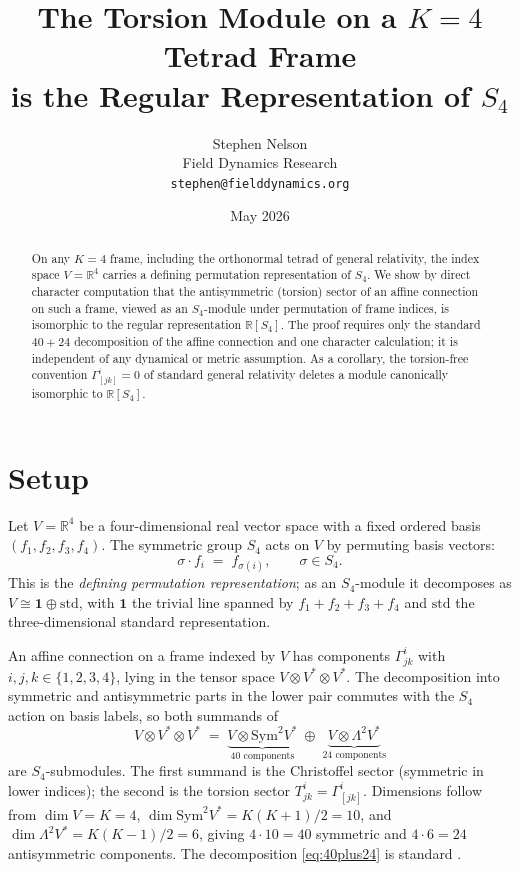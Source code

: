 \documentclass[11pt]{article}
\title{The Torsion Module on a $K=4$ Tetrad Frame \\
       is the Regular Representation of $S_4$}
\author{Stephen Nelson \\[2pt]
        \small Field Dynamics Research \\
        \small\texttt{stephen@fielddynamics.org}}
\date{May 2026}
\theoremstyle{plain}
\theoremstyle{remark}
\begin{document}
\maketitle

\begin{abstract}
On any $K=4$ frame, including the orthonormal tetrad of general relativity, the index space $V = \mathbb{R}^4$ carries a defining permutation representation of $S_4$. We show by direct character computation that the antisymmetric (torsion) sector of an affine connection on such a frame, viewed as an $S_4$-module under permutation of frame indices, is isomorphic to the regular representation $\mathbb{R}[S_4]$. The proof requires only the standard $40+24$ decomposition of the affine connection and one character calculation; it is independent of any dynamical or metric assumption. As a corollary, the torsion-free convention $\Gamma^i_{[jk]} = 0$ of standard general relativity deletes a module canonically isomorphic to $\mathbb{R}[S_4]$.
\end{abstract}

\section{Setup}

Let $V = \mathbb{R}^4$ be a four-dimensional real vector space with a fixed ordered basis $(f_1, f_2, f_3, f_4)$. The symmetric group $S_4$ acts on $V$ by permuting basis vectors:
\[
\sigma \cdot f_i \;=\; f_{\sigma(i)}, \qquad \sigma \in S_4.
\]
This is the \emph{defining permutation representation}; as an $S_4$-module it decomposes as $V \cong \mathbf{1} \oplus \mathrm{std}$, with $\mathbf{1}$ the trivial line spanned by $f_1 + f_2 + f_3 + f_4$ and $\mathrm{std}$ the three-dimensional standard representation.

An affine connection on a frame indexed by $V$ has components $\Gamma^{i}_{jk}$ with $i, j, k \in \{1, 2, 3, 4\}$, lying in the tensor space $V \otimes V^* \otimes V^*$. The decomposition into symmetric and antisymmetric parts in the lower pair commutes with the $S_4$ action on basis labels, so both summands of
\begin{equation}
V \otimes V^* \otimes V^* \;=\; \underbrace{V \otimes \mathrm{Sym}^2 V^*}_{\text{40 components}} \;\oplus\; \underbrace{V \otimes \Lambda^2 V^*}_{\text{24 components}}
\label{eq:40plus24}
\end{equation}
are $S_4$-submodules. The first summand is the Christoffel sector (symmetric in lower indices); the second is the torsion sector $T^{i}_{jk} = \Gamma^{i}_{[jk]}$. Dimensions follow from $\dim V = K = 4$, $\dim \mathrm{Sym}^2 V^* = K(K{+}1)/2 = 10$, and $\dim \Lambda^2 V^* = K(K{-}1)/2 = 6$, giving $4 \cdot 10 = 40$ symmetric and $4 \cdot 6 = 24$ antisymmetric components. The decomposition \eqref{eq:40plus24} is standard \cite[App.~J]{Wald1984}.
\end{document}
